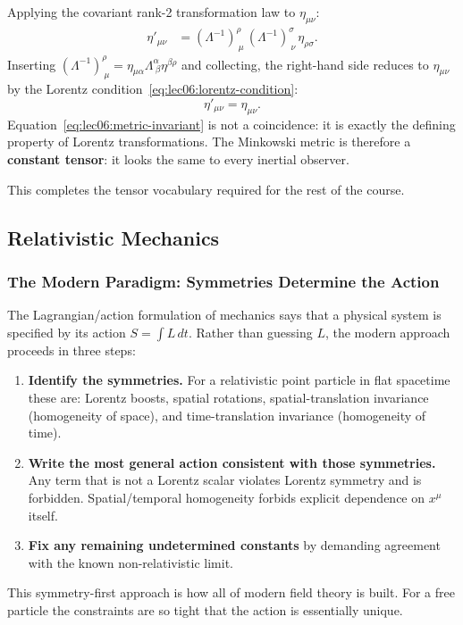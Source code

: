 Applying the covariant rank-2 transformation law to $\eta_{\mu\nu}$:
\begin{align}
    \eta'_{\mu\nu}
    &= (\Lambda^{-1})^\rho_{\ \mu}\,(\Lambda^{-1})^\sigma_{\ \nu}\,\eta_{\rho\sigma} .
    \label{eq:lec06:metric-transform}
\end{align}
Inserting $(\Lambda^{-1})^\rho_{\ \mu} = \eta_{\mu\alpha}\Lambda^\alpha_{\ \beta}\eta^{\beta\rho}$
and collecting, the right-hand side reduces to $\eta_{\mu\nu}$ by the
Lorentz condition~\eqref{eq:lec06:lorentz-condition}:
\begin{equation}\label{eq:lec06:metric-invariant}
    \boxed{\eta'_{\mu\nu} = \eta_{\mu\nu} .}
\end{equation}
Equation~\eqref{eq:lec06:metric-invariant} is not a coincidence: it is exactly the
defining property of Lorentz transformations.  The Minkowski metric is therefore a
\textbf{constant tensor}: it looks the same to every inertial observer.

This completes the tensor vocabulary required for the rest of the course.

\subsection{Relativistic Mechanics}

\subsubsection*{The Modern Paradigm: Symmetries Determine the Action}

The Lagrangian/action formulation of mechanics says that a physical system is
specified by its action $S = \int L\,dt$.  Rather than guessing $L$, the
modern approach proceeds in three steps:
\begin{enumerate}
    \item \textbf{Identify the symmetries.}  For a relativistic point particle
      in flat spacetime these are: Lorentz boosts, spatial rotations,
      spatial-translation invariance (homogeneity of space), and
      time-translation invariance (homogeneity of time).
    \item \textbf{Write the most general action consistent with those
      symmetries.}  Any term that is not a Lorentz scalar violates Lorentz
      symmetry and is forbidden.  Spatial/temporal homogeneity forbids
      explicit dependence on $x^\mu$ itself.
    \item \textbf{Fix any remaining undetermined constants} by demanding
      agreement with the known non-relativistic limit.
\end{enumerate}
This symmetry-first approach is how all of modern field theory is built.  For
a free particle the constraints are so tight that the action is essentially
unique.

